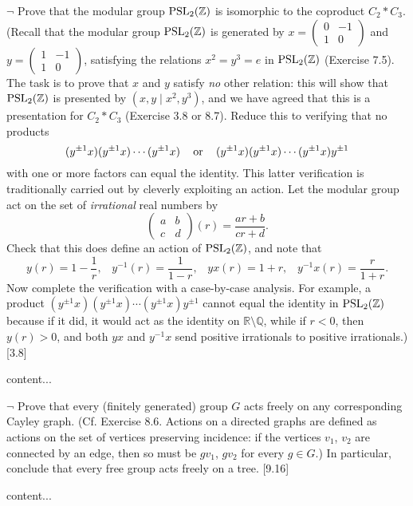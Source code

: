 \begin{exercise}
	$\neg$ Prove that the modular group $\operatorname{PSL}_2(\mathbb{Z})$ is isomorphic to the coproduct $C_2\ast C_3$. 	(Recall that the modular group $\operatorname{PSL}_2(\mathbb{Z})$ is generated by $x = \left(\begin{smallmatrix} 0 & -1 \\ 1 & 0 \end{smallmatrix}\right)$ and $y = \left(\begin{smallmatrix} 1 & -1 \\ 1 & 0 \end{smallmatrix}\right)$, satisfying the relations $x^2 = y^3 = e$ in $\operatorname{PSL}_2(\mathbb{Z})$ (Exercise 7.5). The task is to prove that $x$ and $y$ satisfy \emph{no} other relation: this will show that $\operatorname{PSL}_2(\mathbb{Z})$ is presented by $(x,y\mid x^2,y^3)$, and we have agreed that this is a presentation for $C_2\ast C_3$ (Exercise 3.8 or 8.7). Reduce this to verifying that no products
	\[
		(y^{\pm 1}x)(y^{\pm 1} x)\cdots (y^{\pm 1} x)\;\;\; \textnormal{ or }\;\;\; (y^{\pm 1}x)(y^{\pm 1} x)\cdots (y^{\pm 1} x)y^{\pm 1}
	\]
	with one or more factors can equal the identity. This latter verification is traditionally carried out by cleverly exploiting an action. Let the modular group act on the set of \emph{irrational} real numbers by
	\[
		\begin{pmatrix}
			a & b\\
			c & d
		\end{pmatrix}
		(r) = \frac{ar + b}{cr + d}.
	\]
	Check that this does define an action of $\operatorname{PSL}_2(\mathbb{Z})$, and note that
	\[
		y(r) = 1-\frac{1}{r},\;\;\; y^{-1}(r) = \frac{1}{1 - r},\;\;\; yx(r) = 1 + r,\;\;\; y^{-1}x(r) = \frac{r}{1 + r}.	
	\]
	Now complete the verification with a case-by-case analysis. For example, a product $(y^{\pm 1}x)(y^{\pm 1} x)\cdots (y^{\pm 1} x)y^{\pm 1}$ cannot equal the identity in $\operatorname{PSL}_2(\mathbb{Z})$ because if it did, it would act as the identity on $\mathbb{R}\setminus\mathbb{Q}$, while if $r<0$, then $y(r)>0$, and both $yx$ and $y^{-1}x$ send positive irrationals to positive irrationals.) [3.8]
\end{exercise}
\begin{solution}
	content...
\end{solution}

\begin{exercise}
	$\neg$ Prove that every (finitely generated) group $G$ acts freely on any corresponding Cayley graph. (Cf. Exercise 8.6. Actions on a directed graphs are defined as actions on the set of vertices preserving incidence: if the vertices $v_1$, $v_2$ are connected by an edge, then so must be $gv_1$, $gv_2$ for every $g\in G$.) In particular, conclude that every free group acts freely on a tree. [9.16]
\end{exercise}
\begin{solution}
	content...
\end{solution}

